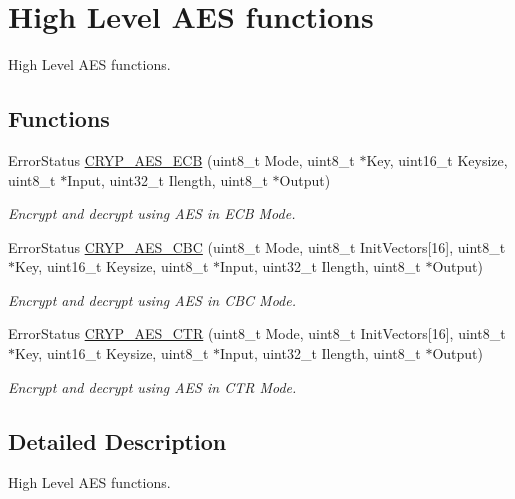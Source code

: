 \hypertarget{group___c_r_y_p___group6}{}\section{High Level A\+E\+S functions}
\label{group___c_r_y_p___group6}


High Level A\+E\+S functions.  


\subsection*{Functions}
\begin{DoxyCompactItemize}
\item 
Error\+Status \hyperlink{group___c_r_y_p___group6_ga79ff82ece0e9620dc86d6e57abe639e1}{C\+R\+Y\+P\+\_\+\+A\+E\+S\+\_\+\+E\+C\+B} (uint8\+\_\+t Mode, uint8\+\_\+t $\ast$Key, uint16\+\_\+t Keysize, uint8\+\_\+t $\ast$Input, uint32\+\_\+t Ilength, uint8\+\_\+t $\ast$Output)
\begin{DoxyCompactList}\small\item\em Encrypt and decrypt using A\+E\+S in E\+C\+B Mode. \end{DoxyCompactList}\item 
Error\+Status \hyperlink{group___c_r_y_p___group6_gaa43eadf707257710f6a53b3295b39d70}{C\+R\+Y\+P\+\_\+\+A\+E\+S\+\_\+\+C\+B\+C} (uint8\+\_\+t Mode, uint8\+\_\+t Init\+Vectors\mbox{[}16\mbox{]}, uint8\+\_\+t $\ast$Key, uint16\+\_\+t Keysize, uint8\+\_\+t $\ast$Input, uint32\+\_\+t Ilength, uint8\+\_\+t $\ast$Output)
\begin{DoxyCompactList}\small\item\em Encrypt and decrypt using A\+E\+S in C\+B\+C Mode. \end{DoxyCompactList}\item 
Error\+Status \hyperlink{group___c_r_y_p___group6_ga2f36aea6e94452e5e5e938547fb89d4c}{C\+R\+Y\+P\+\_\+\+A\+E\+S\+\_\+\+C\+T\+R} (uint8\+\_\+t Mode, uint8\+\_\+t Init\+Vectors\mbox{[}16\mbox{]}, uint8\+\_\+t $\ast$Key, uint16\+\_\+t Keysize, uint8\+\_\+t $\ast$Input, uint32\+\_\+t Ilength, uint8\+\_\+t $\ast$Output)
\begin{DoxyCompactList}\small\item\em Encrypt and decrypt using A\+E\+S in C\+T\+R Mode. \end{DoxyCompactList}\end{DoxyCompactItemize}


\subsection{Detailed Description}
High Level A\+E\+S functions. 

